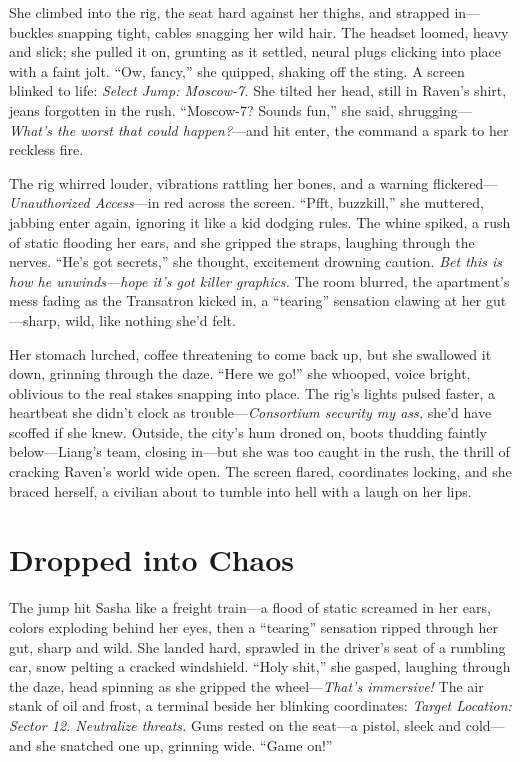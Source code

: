 \documentclass[12pt]{book}
\begin{document}
She climbed into the rig, the seat hard against her thighs, and strapped in—buckles snapping tight, cables snagging her wild hair. The headset loomed, heavy and slick; she pulled it on, grunting as it settled, neural plugs clicking into place with a faint jolt. “Ow, fancy,” she quipped, shaking off the sting. A screen blinked to life: \textit{Select Jump: Moscow-7.} She tilted her head, still in Raven’s shirt, jeans forgotten in the rush. “Moscow-7? Sounds fun,” she said, shrugging—\textit{What’s the worst that could happen?}—and hit enter, the command a spark to her reckless fire.

The rig whirred louder, vibrations rattling her bones, and a warning flickered—\textit{Unauthorized Access}—in red across the screen. “Pfft, buzzkill,” she muttered, jabbing enter again, ignoring it like a kid dodging rules. The whine spiked, a rush of static flooding her ears, and she gripped the straps, laughing through the nerves. “He’s got secrets,” she thought, excitement drowning caution. \textit{Bet this is how he unwinds—hope it’s got killer graphics.} The room blurred, the apartment’s mess fading as the Transatron kicked in, a “tearing” sensation clawing at her gut—sharp, wild, like nothing she’d felt.

Her stomach lurched, coffee threatening to come back up, but she swallowed it down, grinning through the daze. “Here we go!” she whooped, voice bright, oblivious to the real stakes snapping into place. The rig’s lights pulsed faster, a heartbeat she didn’t clock as trouble—\textit{Consortium security my ass,} she’d have scoffed if she knew. Outside, the city’s hum droned on, boots thudding faintly below—Liang’s team, closing in—but she was too caught in the rush, the thrill of cracking Raven’s world wide open. The screen flared, coordinates locking, and she braced herself, a civilian about to tumble into hell with a laugh on her lips.

\section{Dropped into Chaos}

The jump hit Sasha like a freight train—a flood of static screamed in her ears, colors exploding behind her eyes, then a “tearing” sensation ripped through her gut, sharp and wild. She landed hard, sprawled in the driver’s seat of a rumbling car, snow pelting a cracked windshield. “Holy shit,” she gasped, laughing through the daze, head spinning as she gripped the wheel—\textit{That’s immersive!} The air stank of oil and frost, a terminal beside her blinking coordinates: \textit{Target Location: Sector 12. Neutralize threats.} Guns rested on the seat—a pistol, sleek and cold—and she snatched one up, grinning wide. “Game on!”
\end{document}
